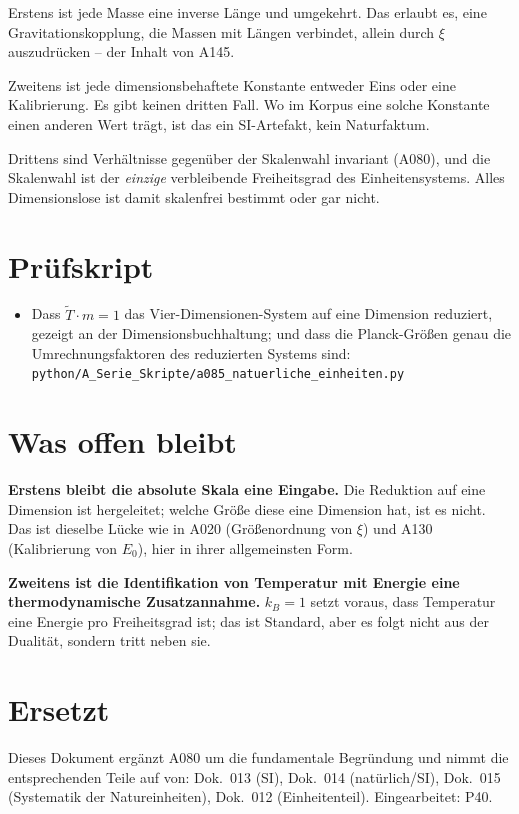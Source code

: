 Erstens ist jede Masse eine inverse Länge und umgekehrt. Das erlaubt es, eine
Gravitationskopplung, die Massen mit Längen verbindet, allein durch $\xi$
auszudrücken -- der Inhalt von A145.

Zweitens ist jede dimensionsbehaftete Konstante entweder Eins oder eine
Kalibrierung. Es gibt keinen dritten Fall. Wo im Korpus eine solche Konstante
einen anderen Wert trägt, ist das ein SI-Artefakt, kein Naturfaktum.

Drittens sind Verhältnisse gegenüber der Skalenwahl invariant (A080), und die
Skalenwahl ist der \emph{einzige} verbleibende Freiheitsgrad des
Einheitensystems. Alles Dimensionslose ist damit skalenfrei bestimmt oder gar
nicht.

\section{Prüfskript}

\begin{itemize}
  \item Dass $\tilde T\cdot m=1$ das Vier-Dimensionen-System auf eine
    Dimension reduziert, gezeigt an der Dimensionsbuchhaltung; und dass die
    Planck-Größen genau die Umrechnungsfaktoren des reduzierten Systems sind:
    \texttt{python/A\_Serie\_Skripte/a085\_natuerliche\_einheiten.py}
\end{itemize}

\section{Was offen bleibt}

\textbf{Erstens bleibt die absolute Skala eine Eingabe.} Die Reduktion auf eine
Dimension ist hergeleitet; welche Größe diese eine Dimension hat, ist es nicht.
Das ist dieselbe Lücke wie in A020 (Größenordnung von $\xi$) und A130
(Kalibrierung von $E_0$), hier in ihrer allgemeinsten Form.

\textbf{Zweitens ist die Identifikation von Temperatur mit Energie eine
thermodynamische Zusatzannahme.} $k_B=1$ setzt voraus, dass Temperatur eine
Energie pro Freiheitsgrad ist; das ist Standard, aber es folgt nicht aus der
Dualität, sondern tritt neben sie.

\section{Ersetzt}

Dieses Dokument ergänzt A080 um die fundamentale Begründung und nimmt die
entsprechenden Teile auf von: Dok.~013 (SI), Dok.~014 (natürlich/SI),
Dok.~015 (Systematik der Natureinheiten), Dok.~012 (Einheitenteil).
Eingearbeitet: P40.

